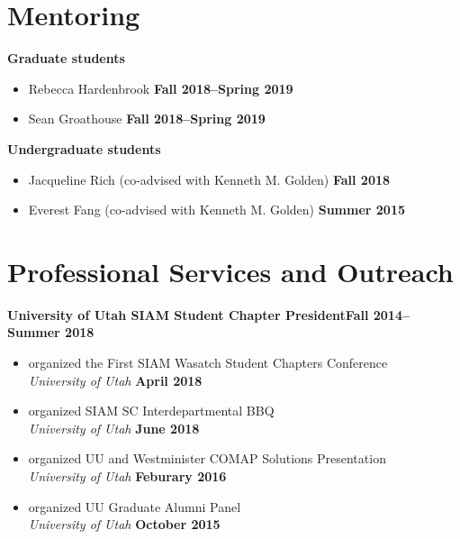 \documentclass[margin,line]{res}
\begin{document}
\begin{resume}
\section{\sc Mentoring}
{\bf Graduate students}
\begin{itemize}
\item[ ] Rebecca Hardenbrook
\hfill {\bf Fall 2018--Spring 2019}
\item [] Sean Groathouse
\hfill {\bf Fall 2018--Spring 2019}
\end{itemize}
{\bf Undergraduate students}
\begin{itemize}
\item[ ] Jacqueline Rich (co-advised with Kenneth M. Golden) 
\hfill {\bf Fall 2018}
\item[ ] Everest Fang (co-advised with Kenneth M. Golden)
\hfill {\bf Summer 2015}
\end{itemize}

\section{\sc Professional Services and Outreach}

{\bf University of Utah SIAM Student Chapter President}\hfill{\bf Fall 2014--Summer 2018}
\begin{itemize}
\item[ ] organized the First SIAM Wasatch Student Chapters Conference 
\\ {\it University of Utah} \hfill {\bf April 2018}
\item[ ] organized SIAM SC Interdepartmental BBQ 
\\ {\it University of Utah} \hfill {\bf June 2018}
\item[ ] organized UU and Westminister COMAP Solutions Presentation
\\ {\it University of Utah} \hfill {\bf Feburary 2016}
\item[ ] organized UU Graduate Alumni Panel 
\\ {\it University of Utah} \hfill {\bf October 2015}
\end{itemize}


\end{resume}
\end{document}
